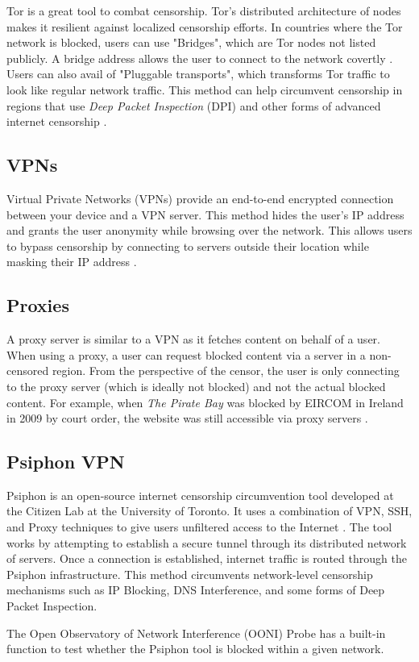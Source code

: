 Tor is a great tool to combat censorship. Tor's distributed architecture of nodes makes it resilient against localized censorship efforts. In countries where the Tor network is blocked, users can use "Bridges", which are Tor nodes not listed publicly. A bridge address allows the user to connect to the network covertly \cite{torprojectBRIDGESProject}. Users can also avail of "Pluggable transports", which transforms Tor traffic to look like regular network traffic. This method can help circumvent censorship in regions that use \textit{Deep Packet Inspection} (DPI) and other forms of advanced internet censorship \cite{torprojectCIRCUMVENTIONProject}.

\subsection{VPNs}

Virtual Private Networks (VPNs) provide an end-to-end encrypted connection between your device and a VPN server. This method hides the user's IP address and grants the user anonymity while browsing over the network. This allows users to bypass censorship by connecting to servers outside their location while masking their IP address \cite{TomsGuideVPN}.

\subsection{Proxies}

A proxy server is similar to a VPN as it fetches content on behalf of a user. When using a proxy, a user can request blocked content via a server in a non-censored region. From the perspective of the censor, the user is only connecting to the proxy server (which is ideally not blocked) and not the actual blocked content. For example, when \textit{The Pirate Bay} was blocked by EIRCOM in Ireland in 2009 by court order, the website was still accessible via proxy servers \cite{PirateBayBlocked2009}.

\subsection{Psiphon VPN}

Psiphon is an open-source internet censorship circumvention tool developed at the Citizen Lab at the University of Toronto. It uses a combination of VPN, SSH, and Proxy techniques to give users unfiltered access to the Internet \cite{ooniPsiphonTest}. The tool works by attempting to establish a secure tunnel through its distributed network of servers. Once a connection is established, internet traffic is routed through the Psiphon infrastructure. This method circumvents network-level censorship mechanisms such as IP Blocking, DNS Interference, and some forms of Deep Packet Inspection. 

The Open Observatory of Network Interference (OONI) Probe has a built-in function to test whether the Psiphon tool is blocked within a given network.